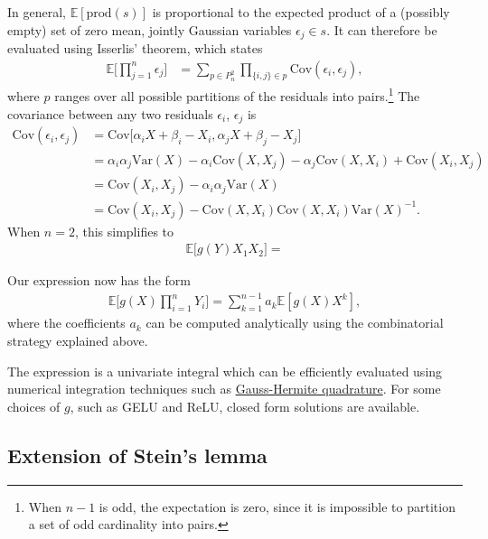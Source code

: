 \documentclass{article}
\theoremstyle{plain}
\theoremstyle{definition}
\theoremstyle{remark}
\newcommand{\E}{\mathbb{E}}
\begin{document}
In general, $\E[ \mathrm{prod}(s) ]$ is proportional to the expected product of a (possibly empty) set of zero mean, jointly Gaussian variables $\epsilon_j\in s$. It can therefore be evaluated using Isserlis' theorem, which states
\begin{align}
    \E \Big [ \prod_{j = 1}^{n} \epsilon_j \Big ] &= \sum_{p \in P^2_{n}} \prod_{\{i, j\} \in p} \mathrm{Cov}(\epsilon_i, \epsilon_j),
\end{align}
where $p$ ranges over all possible partitions of the residuals into pairs.\footnote{When $n - 1$ is odd, the expectation is zero, since it is impossible to partition a set of odd cardinality into pairs.} The covariance between any two residuals $\epsilon_i$, $\epsilon_j$ is
\begin{align}
    \mathrm{Cov}(\epsilon_i, \epsilon_j) &= \mathrm{Cov} \Big [ \alpha_i X + \beta_i - X_i, \alpha_j X + \beta_j - X_j \Big ] \\
    &= \alpha_i \alpha_j \mathrm{Var}(X) - \alpha_i \mathrm{Cov}(X, X_j) - \alpha_j \mathrm{Cov}(X, X_i) + \mathrm{Cov}(X_i, X_j) \\
    &= \mathrm{Cov}(X_i, X_j) - \alpha_i \alpha_j \mathrm{Var}(X) \\
    &= \mathrm{Cov}(X_i, X_j) - \mathrm{Cov}(X, X_i) \mathrm{Cov}(X, X_i) \mathrm{Var}(X)^{-1}.
\end{align}
When $n = 2$, this simplifies to
\begin{align}
    \E \Big [g(Y) X_1 X_2 \Big ] = 
\end{align}

Our expression now has the form
\begin{align}
    \E \Big [g(X) \prod_{i = 1}^{n} Y_i \Big ] = \sum_{k = 1}^{n - 1} a_k \E [ g(X) X^k ],
\end{align}
where the coefficients $a_k$ can be computed analytically using the combinatorial strategy explained above.

The  expression is a univariate integral which can be efficiently evaluated using numerical integration techniques such as \href{https://en.wikipedia.org/wiki/Gauss%E2%80%93Hermite_quadrature}{Gauss-Hermite quadrature}. For some choices of $g$, such as GELU and ReLU, closed form solutions are available.

\subsection{Extension of Stein's lemma}
\end{document}
